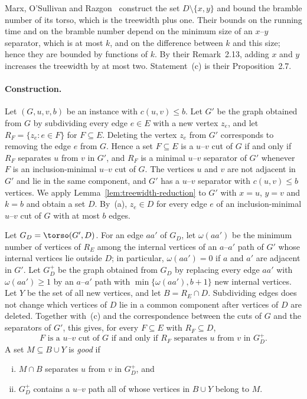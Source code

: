 Marx, O'Sullivan and Razgon~\cite[Lemma~2.11]{Marx2013Separators} construct the set $D \setminus \{x, y\}$ and bound the bramble number of its torso, which is the treewidth plus one.
Their bounds on the running time and on the bramble number depend on the minimum size of an $x$--$y$ separator, which is at most $k$, and on the difference between $k$ and this size; hence they are bounded by functions of $k$.
By their Remark~2.13, adding $x$ and $y$ increases the treewidth by at most two.
Statement~(c) is their Proposition~2.7.

\paragraph{Construction.}
Let $(G, u, v, b)$ be an instance with $c(u,v) \leq b$.
Let $G'$ be the graph obtained from $G$ by subdividing every edge $e \in E$ with a new vertex $z_e$, and let $R_F = \{z_e : e \in F\}$ for $F \subseteq E$.
Deleting the vertex $z_e$ from $G'$ corresponds to removing the edge $e$ from $G$.
Hence a set $F \subseteq E$ is a $u$--$v$ cut of $G$ if and only if $R_F$ separates $u$ from $v$ in $G'$, and $R_F$ is a minimal $u$--$v$ separator of $G'$ whenever $F$ is an inclusion-minimal $u$--$v$ cut of $G$.
The vertices $u$ and $v$ are not adjacent in $G'$ and lie in the same component, and $G'$ has a $u$--$v$ separator with $c(u,v) \leq b$ vertices.
We apply Lemma~\ref{lem:treewidth-reduction} to $G'$ with $x = u$, $y = v$ and $k = b$ and obtain a set $D$.
By~(a), $z_e \in D$ for every edge $e$ of an inclusion-minimal $u$--$v$ cut of $G$ with at most $b$ edges.

Let $G_D = \torso(G', D)$.
For an edge $aa'$ of $G_D$, let $\omega(aa')$ be the minimum number of vertices of $R_E$ among the internal vertices of an $a$--$a'$ path of $G'$ whose internal vertices lie outside $D$; in particular, $\omega(aa') = 0$ if $a$ and $a'$ are adjacent in $G'$.
Let $G_D^+$ be the graph obtained from $G_D$ by replacing every edge $aa'$ with $\omega(aa') \geq 1$ by an $a$--$a'$ path with $\min\{\omega(aa'), b+1\}$ new internal vertices.
Let $Y$ be the set of all new vertices, and let $B = R_E \cap D$.
Subdividing edges does not change which vertices of $D$ lie in a common component after vertices of $D$ are deleted.
Together with~(c) and the correspondence between the cuts of $G$ and the separators of $G'$, this gives, for every $F \subseteq E$ with $R_F \subseteq D$,
\begin{equation}
\label{eq:cut-separator}
\text{$F$ is a $u$--$v$ cut of $G$ if and only if $R_F$ separates $u$ from $v$ in $G_D^+$.}
\end{equation}
A set $M \subseteq B \cup Y$ is \emph{good} if
\begin{enumerate}[(i)]
    \item $M \cap B$ separates $u$ from $v$ in $G_D^+$, and
    \item $G_D^+$ contains a $u$--$v$ path all of whose vertices in $B \cup Y$ belong to $M$.
\end{enumerate}

